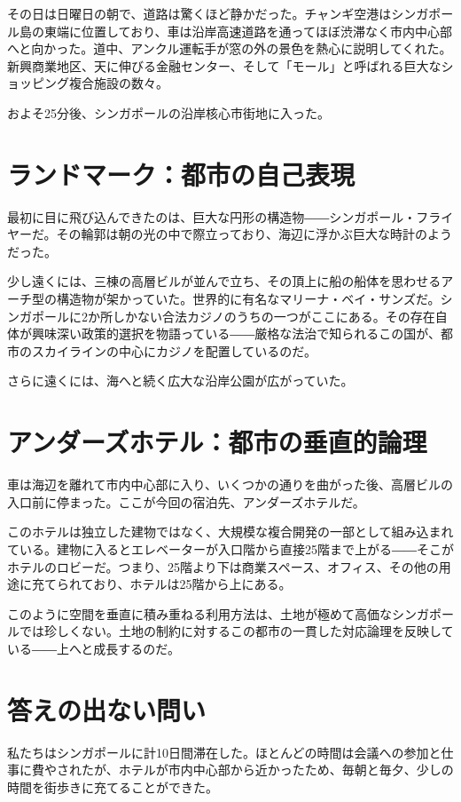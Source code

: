 その日は日曜日の朝で、道路は驚くほど静かだった。チャンギ空港はシンガポール島の東端に位置しており、車は沿岸高速道路を通ってほぼ渋滞なく市内中心部へと向かった。道中、アンクル運転手が窓の外の景色を熱心に説明してくれた。新興商業地区、天に伸びる金融センター、そして「モール」と呼ばれる巨大なショッピング複合施設の数々。

およそ25分後、シンガポールの沿岸核心市街地に入った。

\section{ランドマーク：都市の自己表現}

最初に目に飛び込んできたのは、巨大な円形の構造物――シンガポール・フライヤーだ。その輪郭は朝の光の中で際立っており、海辺に浮かぶ巨大な時計のようだった。

少し遠くには、三棟の高層ビルが並んで立ち、その頂上に船の船体を思わせるアーチ型の構造物が架かっていた。世界的に有名なマリーナ・ベイ・サンズだ。シンガポールに2か所しかない合法カジノのうちの一つがここにある。その存在自体が興味深い政策的選択を物語っている――厳格な法治で知られるこの国が、都市のスカイラインの中心にカジノを配置しているのだ。

さらに遠くには、海へと続く広大な沿岸公園が広がっていた。

\section{アンダーズホテル：都市の垂直的論理}

車は海辺を離れて市内中心部に入り、いくつかの通りを曲がった後、高層ビルの入口前に停まった。ここが今回の宿泊先、アンダーズホテルだ。

このホテルは独立した建物ではなく、大規模な複合開発の一部として組み込まれている。建物に入るとエレベーターが入口階から直接25階まで上がる――そこがホテルのロビーだ。つまり、25階より下は商業スペース、オフィス、その他の用途に充てられており、ホテルは25階から上にある。

このように空間を垂直に積み重ねる利用方法は、土地が極めて高価なシンガポールでは珍しくない。土地の制約に対するこの都市の一貫した対応論理を反映している――上へと成長するのだ。

\section{答えの出ない問い}

私たちはシンガポールに計10日間滞在した。ほとんどの時間は会議への参加と仕事に費やされたが、ホテルが市内中心部から近かったため、毎朝と毎夕、少しの時間を街歩きに充てることができた。

